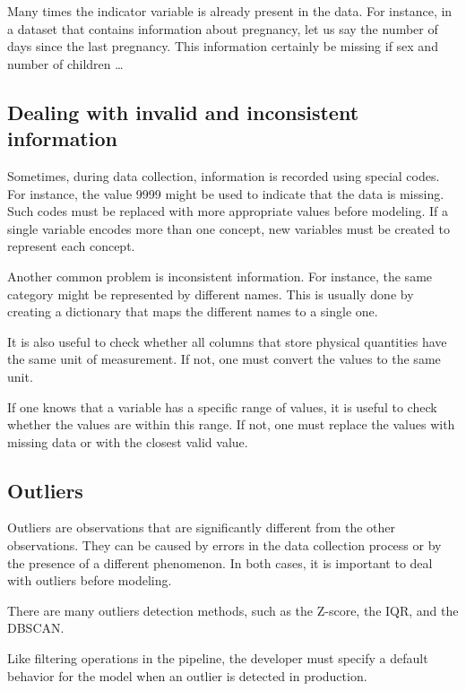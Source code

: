 
Many times the indicator variable is already present in the data.  For instance, in a
dataset that contains information about pregnancy, let us say the number of days since
the last pregnancy.  This information certainly be missing if sex and number of children \dots


\subsection{Dealing with invalid and inconsistent information}

Sometimes, during data collection, information is recorded using special codes.  For
instance, the value 9999 might be used to indicate that the data is missing.  Such codes
must be replaced with more appropriate values before modeling.  If a single variable
encodes more than one concept, new variables must be created to represent each concept.

Another common problem is inconsistent information.  For instance, the same category might
be represented by different names.  This is usually done by creating a dictionary that
maps the different names to a single one.

It is also useful to check whether all columns that store physical quantities have the
same unit of measurement.  If not, one must convert the values to the same unit.

If one knows that a variable has a specific range of values, it is useful to check
whether the values are within this range.  If not, one must replace the values with
missing data or with the closest valid value.

\subsection{Outliers}

Outliers are observations that are significantly different from the other observations.
They can be caused by errors in the data collection process or by the presence of a
different phenomenon.  In both cases, it is important to deal with outliers before
modeling.

There are many outliers detection methods, such as the Z-score, the IQR, and the DBSCAN.

Like filtering operations in the pipeline, the developer must specify a default behavior
for the model when an outlier is detected in production.

